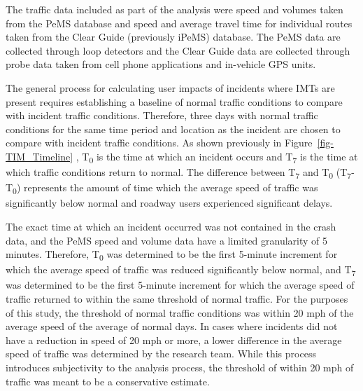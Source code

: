 \documentclass[
  letterpaper,
  authoryear]{elsarticle}
\begin{document}
The traffic data included as part of the analysis were speed and volumes
taken from the PeMS database and speed and average travel time for
individual routes taken from the Clear Guide (previously iPeMS)
database. The PeMS data are collected through loop detectors and the
Clear Guide data are collected through probe data taken from cell phone
applications and in-vehicle GPS units.

The general process for calculating user impacts of incidents where IMTs
are present requires establishing a baseline of normal traffic
conditions to compare with incident traffic conditions. Therefore, three
days with normal traffic conditions for the same time period and
location as the incident are chosen to compare with incident traffic
conditions. As shown previously in Figure~\ref{fig-TIM_Timeline} ,
T\textsubscript{0} is the time at which an incident occurs and
T\textsubscript{7} is the time at which traffic conditions return to
normal. The difference between T\textsubscript{7} and T\textsubscript{0}
(T\textsubscript{7}-T\textsubscript{0}) represents the amount of time
which the average speed of traffic was significantly below normal and
roadway users experienced significant delays.

The exact time at which an incident occurred was not contained in the
crash data, and the PeMS speed and volume data have a limited
granularity of 5 minutes. Therefore, T\textsubscript{0} was determined
to be the first 5-minute increment for which the average speed of
traffic was reduced significantly below normal, and T\textsubscript{7}
was determined to be the first 5-minute increment for which the average
speed of traffic returned to within the same threshold of normal
traffic. For the purposes of this study, the threshold of normal traffic
conditions was within 20 mph of the average speed of the average of
normal days. In cases where incidents did not have a reduction in speed
of 20 mph or more, a lower difference in the average speed of traffic
was determined by the research team. While this process introduces
subjectivity to the analysis process, the threshold of within 20 mph of
traffic was meant to be a conservative estimate.
\end{document}
